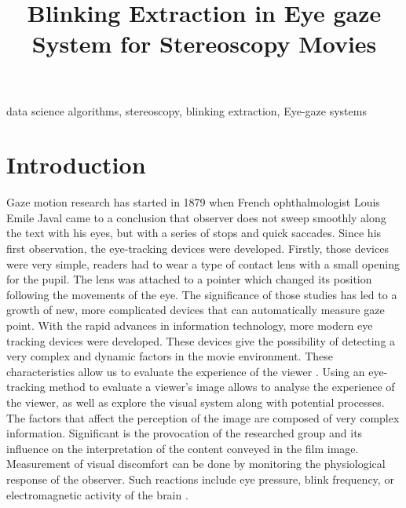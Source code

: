 \documentclass[conference]{IEEEtran}
\begin{document}
\title{Blinking Extraction in Eye gaze System for Stereoscopy Movies}

\author{
\and
{}
}

\maketitle


\begin{IEEEkeywords}
data science algorithms, stereoscopy, blinking extraction, Eye-gaze systems
\end{IEEEkeywords}

\section{Introduction}
Gaze motion research has started in 1879 when French ophthalmologist Louis Emile Javal came to a conclusion that observer does not sweep smoothly along the text with his eyes, but with a series of stops and quick saccades\cite{Winery}.  Since his first observation, the eye-tracking devices were developed. Firstly, those devices were very simple, readers had to wear a type of contact lens with a small opening for the pupil. The lens was attached to a pointer which changed its position following the movements of the eye. The significance of those studies has led to a growth of new, more complicated devices that can automatically measure gaze point. With the rapid advances in information technology, more modern eye tracking devices were developed. These devices give the possibility of detecting a very complex and dynamic factors in the movie environment. These characteristics allow us to evaluate the experience of the viewer \cite{mital2011clustering}.
Using an eye-tracking method to evaluate a viewer's image allows to analyse the experience of the viewer, as well as explore the visual system along with potential processes.
The factors that affect the perception of the image are composed of very complex information. Significant is the provocation of the researched group and its influence on the interpretation of the content conveyed in the film image. Measurement of visual discomfort can be done by monitoring the physiological response of the observer. Such reactions include eye pressure, blink frequency, or electromagnetic activity of the brain \cite{Fornalczyk_Napieralski_Szajerman_Wojciechowski_2015, Fornalczyk_Napieralski_Szajerman_Wojciechowski_20152}.
\end{document}
